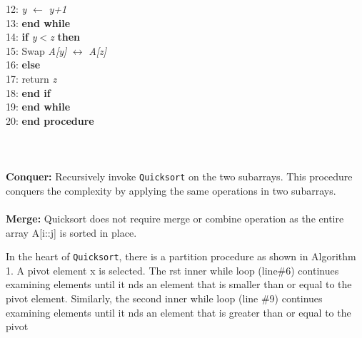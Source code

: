 \documentclass{article}
\begin{document}
\begin{multicols}{2}
12:\hspace{4ex} \hspace{4ex} \hspace{4ex} \textit{y} $\leftarrow$ \textit{y+1}\\
13:\hspace{4ex} \hspace{4ex} \textbf{end while}\\
14:\hspace{4ex} \hspace{4ex} \textbf{if} \textit{y$<$z} \textbf{then}\\
15:\hspace{4ex} \hspace{4ex} \hspace{4ex} Swap \textit{A[y]} $\leftrightarrow$ \textit{A[z]}\\
16:\hspace{4ex} \hspace{4ex} \textbf{else}\\
17:\hspace{4ex} \hspace{4ex} \hspace{4ex} return \textit{z}\\
18:\hspace{4ex} \hspace{4ex} \textbf{end if}\\
19:\hspace{4ex} \textbf{end while}\\
20: \textbf{end procedure}\\
\noindent\makebox[\linewidth]{\rule{0.5\textwidth}{0.4pt}}\\
\\
\\
\textbf{Conquer:} Recursively invoke \texttt{Quicksort} on the
two subarrays. This procedure conquers the complexity by applying the same operations in two subarrays.\\\\
\textbf{Merge:} Quicksort does not require merge or combine operation as the entire array A[i::j] is sorted
in place.\par
In the heart of \texttt{Quicksort}, there is a partition
procedure as shown in Algorithm 1. A pivot element x is selected. The rst inner while loop (line\#6) continues examining elements until it nds an
element that is smaller than or equal to the pivot element. Similarly, the second inner while loop (line
\#9) continues examining elements until it nds an
element that is greater than or equal to the pivot

\end{multicols}
\end{document}
